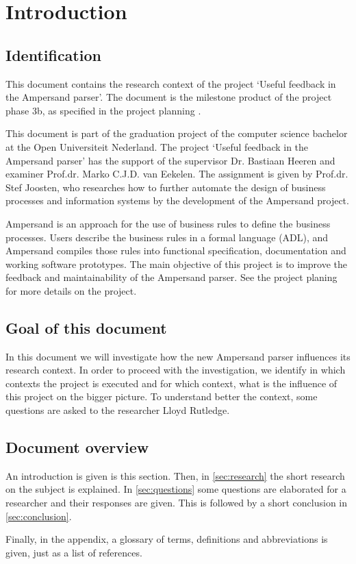 
\section{Introduction}
\subsection{Identification}
This document contains the research context of the project `Useful feedback in the Ampersand parser'.
The document is the milestone product of the project phase 3b, as specified in the project planning .

This document is part of the graduation project of the computer science bachelor at the Open Universiteit Nederland.
The project `Useful feedback in the Ampersand parser' has the support of the supervisor Dr. Bastiaan Heeren and examiner Prof.dr. Marko C.J.D. van Eekelen.
The assignment is given by Prof.dr. Stef Joosten, who researches how to further automate the design of business processes and information systems by the development of the Ampersand project.

Ampersand is an approach for the use of business rules to define the business processes.
Users describe the business rules in a formal language (ADL), and Ampersand compiles those rules into functional specification, documentation and working software
prototypes.
The main objective of this project is to improve the feedback and maintainability of the Ampersand parser.
See the project planing  for more details on the project.

\subsection{Goal of this document}
In this document we will investigate how the new Ampersand parser influences its research context.
In order to proceed with the investigation, we identify in which contexts the project is executed and for which context, what is the influence of this project on the bigger picture.
To understand better the context, some questions are asked to the researcher Lloyd Rutledge.

\subsection{Document overview}
An introduction is given is this section.
Then, in \autoref{sec:research} the short research on the subject is explained.
In \autoref{sec:questions} some questions are elaborated for a researcher and their responses are given.
This is followed by a short conclusion in \autoref{sec:conclusion}.

Finally, in the appendix, a glossary of terms, definitions and abbreviations is given, just as a list of references.
